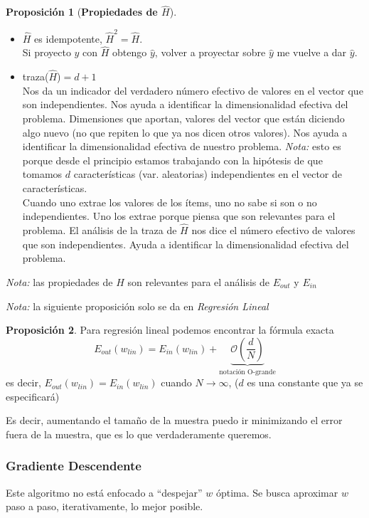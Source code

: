 \documentclass[11pt,a4paper]{article}
\theoremstyle{definition}
\newtheorem{proposition}{Proposición}[section]
\begin{document}
	\begin{proposition}[\textbf{Propiedades de $\hat H$}] $\ $
	\begin{itemize}
		\item $\hat H$ es idempotente, $\hat H^2=\hat H$. \\Si proyecto $y$ con $\hat H$ obtengo $\hat y$, volver a proyectar sobre $\hat y$ me vuelve a dar $\hat y$.
		\item traza($\hat H$)$=d+1$\\
		Nos da un indicador del verdadero número efectivo de valores en el vector que son independientes. Nos ayuda a identificar la dimensionalidad efectiva del problema. Dimensiones que aportan, valores del vector que están diciendo algo nuevo (no que repiten lo que ya nos dicen otros valores). Nos ayuda a identificar la dimensionalidad efectiva de nuestro problema. \textit{Nota:} esto es porque desde el principio estamos trabajando con la hipótesis de que tomamos $d$ características (var. aleatorias) independientes en el vector de características.\\
		
		Cuando uno extrae los valores de los ítems, uno no sabe si son o no independientes. Uno los extrae porque piensa que son relevantes para el problema. El análisis de la traza de $\hat H$ nos dice el número efectivo de valores que son independientes. Ayuda a identificar la dimensionalidad efectiva del problema.
	\end{itemize}
	
	\end{proposition}
	\textit{Nota:} las propiedades de $\hat H$ son relevantes para el análisis de $E_{out}$ y $E_{in}$
	
	\textit{Nota:} la siguiente proposición solo se da en \textit{Regresión Lineal}
	\begin{proposition}
	Para regresión lineal podemos encontrar la fórmula exacta
	$$E_{out}(w_{lin})=E_{in}(w_{lin})+\underbrace{\mathcal{O}\left(\frac{d}{N}\right)}_{\text{notación O-grande}}$$
	es decir, $E_{out}(w_{lin})=E_{in}(w_{lin})$ cuando $N\to \infty$, ($d$ es una constante que ya se especificará)
	\end{proposition}
	Es decir, aumentando el tamaño de la muestra puedo ir minimizando el error fuera de la muestra, que es lo que verdaderamente queremos.
	
	\subsubsection{Gradiente Descendente}
	Este algoritmo no está enfocado a ``despejar'' $w$ óptima. Se busca aproximar $w$ paso a paso, iterativamente, lo mejor posible.
	
\end{document}

